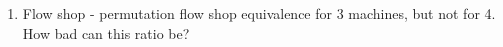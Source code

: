 \documentclass[11pt]{article}
\begin{document}
\MakeScribeTop
\begin{enumerate}
\item Flow shop - permutation flow shop equivalence for 3 machines, but not for 4. How bad can this ratio be?
\end{enumerate}
\end{document}
